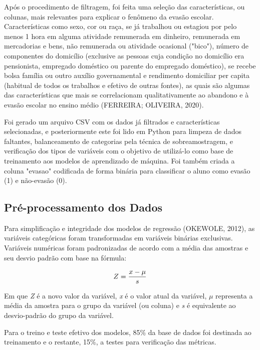 \documentclass[english, spanish, brazilian]{RBIEarticle} %
\begin{document}
Após o procedimento de filtragem, foi feita uma seleção das características, ou colunas, mais relevantes para explicar o fenômeno da evasão escolar. Características como sexo, cor ou raça, se já trabalhou ou estagiou por pelo menos 1 hora em alguma atividade remunerada em dinheiro, remunerada em mercadorias e bens, não remunerada ou atividade ocasional ("bico"), número de componentes do domicílio (exclusive as pessoas cuja condição no domicílio era pensionista, empregado doméstico ou parente do empregado doméstico), se recebe bolsa família ou outro auxílio governamental e rendimento domiciliar per capita
(habitual de todos os trabalhos e efetivo de outras fontes), as quais são algumas das características que mais se correlacionam qualitativamente ao abandono e à evasão escolar no ensino médio (FERREIRA; OLIVEIRA, 2020).

Foi gerado um arquivo CSV com os dados já filtrados e características selecionadas, e posteriormente este foi lido em Python para limpeza de dados faltantes, balanceamento de categorias pela técnica de sobreamostragem, e verificação dos tipos de variáveis com o objetivo de utilizá-lo como base de treinamento aos modelos de aprendizado de máquina. Foi também criada a coluna "evasao" codificada de forma binária para classificar o aluno como evasão (1) e não-evasão (0).


\subsection{Pré-processamento dos Dados}
Para simplificação e integridade dos modelos de regressão (OKEWOLE, 2012), as variáveis categóricas foram transformadas em variáveis binárias exclusivas. Variáveis numéricas foram padronizadas de acordo com a média das amostras e seu desvio padrão com base na fórmula:

\vspace{0.5cm}
\begin{equation}
\large Z = \frac{x-\mu}{s}
\end{equation}
\vspace{0.5cm}

Em que \textit{Z} é a novo valor da variável, \textit{x} é o valor atual da variável, $\mu$ representa a média da amostra para o grupo da variável (ou coluna) e \textit{s} é equivalente ao desvio-padrão do grupo da variável.

Para o treino e teste efetivo dos modelos, 85\% da base de dados foi destinada ao treinamento e o restante, 15\%, a testes para verificação das métricas. 
\end{document}
